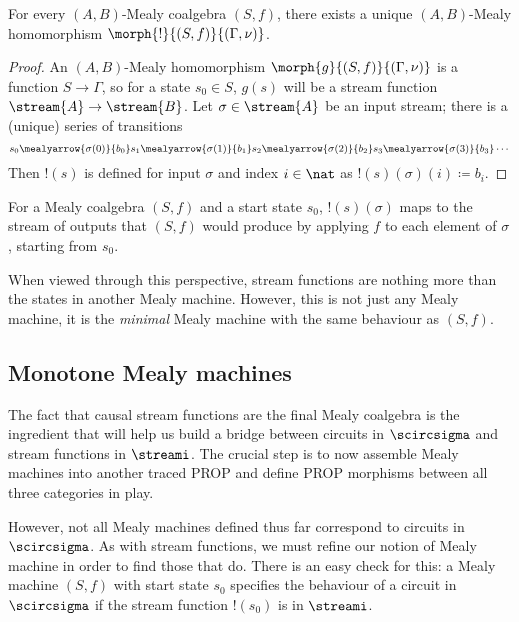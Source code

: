 \begin{proposition}
    \label{prop:final-coalgebra}
    For every \((A,B)\)-Mealy coalgebra \((S,f)\), there exists a
    unique \((A,B)\)-Mealy homomorphism \(\morph{{!}}{(S,f)}{(\Gamma,\nu)}\).
\end{proposition}
\begin{proof}
    An \((A,B)\)-Mealy homomorphism \(\morph{g}{(S, f)}{(\Gamma, \nu)}\) is a
    function \(S \to \Gamma\), so for a state \(s_0 \in S\), \(g(s)\) will be a
    stream function \(\stream{A} \to \stream{B}\).
    Let \(\sigma \in \stream{A}\) be an input stream; there is a (unique) series
    of transitions \[
        s_0
        \mealyarrow{\sigma(0)}{b_0}
        s_1
        \mealyarrow{\sigma(1)}{b_1}
        s_2
        \mealyarrow{\sigma(2)}{b_2}
        s_3
        \mealyarrow{\sigma(3)}{b_3}
        \cdots
    \]
    Then \(!(s)\) is defined for input \(\sigma\) and
    index \(i \in \nat\) as \(!(s)(\sigma)(i) \coloneqq b_i\).
\end{proof}

For a Mealy coalgebra \((S, f)\) and a start state \(s_0\),
\(!(s)(\sigma)\) maps to the stream of outputs that \((S, f)\) would produce
by applying \(f\) to each element of \(\sigma\), starting from \(s_0\).

When viewed through this perspective, stream functions are nothing more than the
states in another Mealy machine.
However, this is not just any Mealy machine, it is the \emph{minimal} Mealy
machine with the same behaviour as \((S, f)\).

\subsection{Monotone Mealy machines}

The fact that causal stream functions are the final Mealy coalgebra is the
ingredient that will help us build a bridge between circuits in \(\scircsigma\)
and stream functions in \(\streami\).
The crucial step is to now assemble Mealy machines into another traced PROP
and define PROP morphisms between all three categories in play.

However, not all Mealy machines defined thus far correspond to circuits in
\(\scircsigma\).
As with stream functions, we must refine our notion of Mealy machine in
order to find those that do.
There is an easy check for this: a Mealy machine \((S, f)\) with start state
\(s_0\) specifies the behaviour of a circuit in \(\scircsigma\) if the
stream function \(!(s_0)\) is in \(\streami\).

